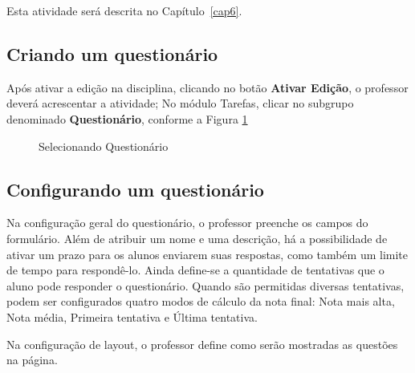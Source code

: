 Esta atividade será descrita no Capítulo~\ref{cap6}.

\subsection{Criando um questionário}
Após ativar a edição na disciplina, clicando no botão  \textbf{Ativar Edição}, o professor deverá acrescentar a atividade; No módulo Tarefas, clicar no subgrupo denominado \textbf{Questionário}, conforme a Figura \ref{fig:cap5_22}

\begin{figure}[htbp]
 \begin{center}
  \caption{Selecionando Questionário}
  \label{fig:cap5_22}
 \end{center}
\end{figure}

\subsection{Configurando um questionário}
Na configuração geral do questionário, o professor preenche os campos do formulário. Além de atribuir um nome e uma descrição, há a possibilidade de ativar um prazo para os alunos enviarem suas respostas, como também um limite de tempo para respondê-lo. Ainda define-se a quantidade de tentativas que o aluno pode responder o questionário. Quando são permitidas diversas tentativas, podem ser configurados quatro modos de cálculo da nota final: Nota mais alta, Nota média, Primeira tentativa e Última tentativa.

Na configuração de layout, o professor define como serão mostradas as questões na página.

